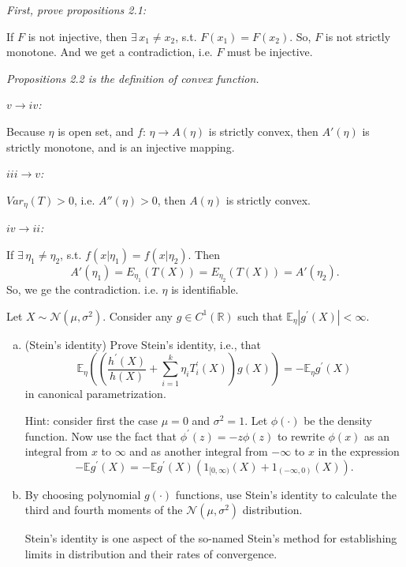 \begin{solution}
    \emph{First, prove propositions 2.1: }

    If $F$ is not injective, then $\exists\, x_1\neq x_2$, s.t. $F(x_1)=F(x_2)$. So, $F$ is not strictly monotone. And we get a contradiction, i.e. $F$ must be injective. 

    \emph{Propositions 2.2 is the definition of convex function. }

    \emph{$v\to iv$: }

    Because $\eta$ is open set, and $f:\,\eta\to A(\eta)$ is strictly convex, then $A'(\eta)$ is strictly monotone, and is an injective mapping. 

    \emph{$iii\to v$: }

    $Var_\eta(T)>0$, i.e. $A''(\eta)>0$, then $A(\eta)$ is strictly convex. 

    \emph{$iv\to ii$: }

    If $\exists\,\eta_1\neq\eta_2$, s.t. $f(x|\eta_1)=f(x|\eta_2)$. Then 
    \[
        A'(\eta_1)=E_{\eta_1}(T(X))=E_{\eta_2}(T(X))=A'(\eta_2). 
    \]
    So, we ge the contradiction. i.e. $\eta$ is identifiable. 
\end{solution}

\begin{exercise}
    Let \(X \sim \mathcal{N}\left(\mu, \sigma^{2}\right)\). Consider any \(g \in C^{1}(\mathbb{R})\) such that \(\mathbb{E}_{\eta}\left|g^{\prime}(X)\right|<\infty\). 
    \begin{enumerate}[(a)]
        \item (Stein's identity) Prove Stein's identity, i.e., that
        \[
        \mathbb{E}_{\eta}\left(\left(\frac{h^{\prime}(X)}{h(X)}+\sum_{i=1}^{k} \eta_{i} T_{i}^{\prime}(X)\right) g(X)\right)=-\mathbb{E}_{\eta} g^{\prime}(X)
        \]
        in canonical parametrization. 
        
        Hint: consider first the case \(\mu=0\) and \(\sigma^{2}=1\). Let \(\phi(\cdot)\) be the density function. Now use the fact that \(\phi^{\prime}(z)=-z \phi(z)\) to rewrite \(\phi(x)\) as an integral from \(x\) to \(\infty\) and as another integral from \(-\infty\) to \(x\) in the expression
        \[
            -\mathbb{E} g^{\prime}(X)=-\mathbb{E} g^{\prime}(X)\left(1_{[0, \infty)}(X)+1_{(-\infty, 0)}(X)\right). 
        \]
        \item By choosing polynomial \(g(\cdot)\) functions, use Stein's identity to calculate the third and fourth moments of the \(\mathcal{N}\left(\mu, \sigma^{2}\right)\) distribution.
        
         Stein's identity is one aspect of the so-named Stein's method for establishing limits in distribution and their rates of convergence.
    \end{enumerate}
\end{exercise}

